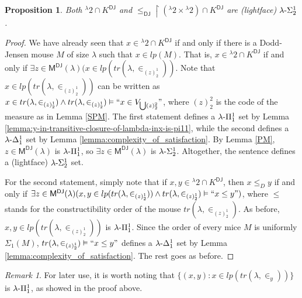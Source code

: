 \documentclass{amsart}
\numberwithin{equation}{section}
\def\hyp{{\hbox{-}}}
\newtheorem{proposition}[theorem]{Proposition}
\theoremstyle{definition}
\theoremstyle{remark}
\newtheorem{remark}[theorem]{Remark}
\begin{document}
\begin{proposition}\label{lemma:order-and-cantor-are-sigma-1-2} Both ${}^{\lambda}2\cap K^{\mathsf{DJ}}$ and $\leq_{\mathsf{DJ}}\upharpoonright({}^{\lambda}2\times{}^{\lambda}2)\cap K^{\mathsf{DJ}}$ are \emph{(lightface)} $\lambda\hyp\Sigma^1_2$. 
\end{proposition}
\begin{proof} We have already seen that $x\in{}^{\lambda}2\cap K^{\mathsf{DJ}}$ if and only if there is a Dodd-Jensen mouse $M$ of size $\lambda$ such that $x\in lp(M)$. That is, $x\in{}^{\lambda}2\cap K^{\mathsf{DJ}}$ if and only if $\exists z\in\mathsf{M^{\mathsf{DJ}}}(\lambda)(x\in lp(tr(\lambda,\in_{(z)^1_2}))$. Note that $x\in lp(tr(\lambda,\in_{(z)^1_2}))$ can be written as $x\in tr(\lambda,\in_{(z)^1_2})\wedge tr(\lambda,\in_{(z)^1_2})\vDash``x\in V_{\bigcup(z)^2_2}"$, where $(z)^{2}_{2}$ is the code of the measure as in Lemma \ref{SPM}. The first statement defines a $\lambda\hyp\Pi^1_1$ set by Lemma \ref{lemma:y-in-transitive-closure-of-lambda-inx-is-pi11}, while the second defines a $\lambda\hyp\Delta^1_1$ set by Lemma \ref{lemma:complexity_of_satisfaction}. By Lemma \ref{PM}, $z\in\mathsf{M^{DJ}}(\lambda)$ is $\lambda\hyp\Pi^1_1$, so $\exists z\in\mathsf{M^{DJ}}(\lambda)$ is $\lambda\hyp\Sigma^1_2$. Altogether, the sentence defines a (lightface) $\lambda\hyp\Sigma^1_2$ set. 

For the second statement, simply note that if $x,y\in{}^{\lambda}2\cap K^{\mathsf{DJ}}$, then $x\leq_{D}y$ if and only if $\exists z\in\mathsf{M^{DJ}}(\lambda)(x,y\in lp(tr(\lambda,\in_{(z)^1_{2}}))\wedge tr(\lambda,\in_{(z)^{1}_{2}})\vDash``x\leq y")$, where $\leq$ stands for the constructibility order of the mouse $tr(\lambda,\in_{(z)^{1}_{2}})$. As before, $x,y\in lp(tr(\lambda,\in_{(z)^{1}_{2}}))$ is $\lambda\hyp\Pi^1_1$. Since the order of every mice $M$ is uniformly $\Sigma_1(M)$, $tr(\lambda,\in_{(z)^{1}_{2}})\vDash``x\leq y"$ defines a $\lambda\hyp\Delta^1_1$ set by Lemma \ref{lemma:complexity_of_satisfaction}. The rest goes as before.
\end{proof}

\begin{remark}\label{remark:y-in-lower-part-of-x-is-pi-1-1}
    For later use, it is worth noting that $\{(x,y) : x \in lp(tr(\lambda,\in_y))\}$ is $\lambda\hyp\Pi^1_1$, as showed in the proof above.
\end{remark}
\end{document}
